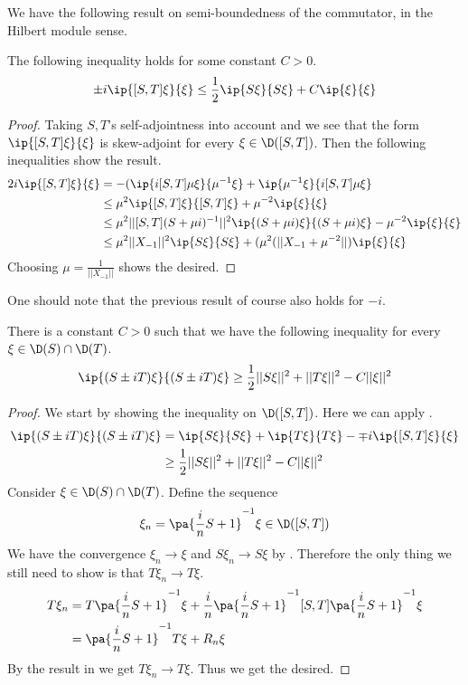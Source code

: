 We have the following result on semi-boundedness of the commutator, in the Hilbert module sense. 
\begin{lemma}\label{estimatelemma1}
	The following inequality holds for some constant $C>0$. 
	\begin{align*}
		\pm i\ip{[S,T]\xi}{\xi}\leq \frac{1}{2}\ip{S\xi}{S\xi}+C\ip{\xi}{\xi}
	\end{align*}
\end{lemma}
\begin{proof}
	Taking $S,T$'s self-adjointness into account and  we see that the form $\ip{[S,T]\xi}{\xi}$ is skew-adjoint for every $\xi \in \D([S,T])$. Then the following inequalities show the result. 
	\begin{align*}
		2i\ip{[S,T]\xi}{\xi}&=-(\ip{i[S,T]\mu\xi}{\mu^{-1}\xi}+\ip{\mu^{-1}\xi}{i[S,T]\mu\xi} \\
		&\leq \mu^2 \ip{[S,T]\xi}{[S,T]\xi}+\mu^{-2}\ip{\xi}{\xi} \\
		&\leq \mu^2 ||[S,T](S+\mu i)^{-1}||^2\ip{(S+\mu i)\xi}{(S+\mu i)\xi}-\mu^{-2}\ip{\xi}{\xi} \\
		&\leq \mu^2||X_{-1}||^2 \ip{S\xi}{S\xi}+(\mu^2(||X_{-1}+\mu^{-2}||)\ip{\xi}{\xi}
	\end{align*}
	Choosing $\mu=\frac{1}{||X_{-1}||}$ shows the desired.
\end{proof}
One should note that the previous result of course also holds for $-i$. 
\begin{lemma}\label{estimatelemma2}
	There is a constant $C>0$ such that we have the following inequality for every $\xi \in \D(S)\cap \D(T)$. 
	\begin{align*}
		\ip{(S\pm iT)\xi}{(S\pm iT)\xi}\geq \frac{1}{2}||S\xi||^2+||T\xi||^2-C||\xi||^2
	\end{align*}
\end{lemma}
\begin{proof}
	We start by showing the inequality on $\D([S,T])$. Here we can apply . 
	\begin{align*}
		\ip{(S\pm iT)\xi}{(S\pm iT)\xi}&=\ip{S\xi}{S\xi}+\ip{T\xi}{T\xi}-\mp i\ip{[S,T]\xi}{\xi} \\
		&\geq \frac{1}{2} ||S\xi||^2+||T\xi||^2-C||\xi||^2
	\end{align*}
	Consider $\xi\in \D(S)\cap \D(T)$. Define the sequence
	\begin{align*}
		\xi_n=\pa{\frac{i}{n}S+1}^{-1}\xi \in \D([S,T])
	\end{align*}
	We have the convergence $\xi_n\to \xi$ and $S\xi_n \to S\xi$ by . Therefore the only thing we still need to show is that $T\xi_n\to T\xi$. 
	\begin{align*}
		T\xi_n&=T\pa{\frac{i}{n}S+1}^{-1}\xi+\frac{i}{n}\pa{\frac{i}{n}S+1}^{-1}[S,T]\pa{\frac{i}{n}S+1}^{-1}\xi \\
		&=\pa{\frac{i}{n}S+1}^{-1}T\xi+R_n\xi
	\end{align*}
	By the result in  we get $T\xi_n\to T\xi$. Thus we get the desired. 
\end{proof}
